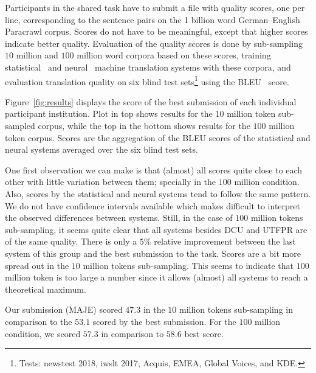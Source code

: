 Participants in the shared task have to submit a file with quality scores, one per line, corresponding to the sentence pairs on the 1 billion word German–English Paracrawl corpus. Scores do not have to be meaningful, except that higher scores indicate better quality. Evaluation of the quality scores is done by sub-sampling $10$ million and $100$ million word corpora based on these scores, training statistical~\cite{Moses} and neural~\cite{Marian} machine translation systems with these corpora, and evaluation translation quality on six blind test sets\footnote{Tests: newstest 2018, iwslt 2017, Acquis, EMEA, Global Voices, and KDE.} using the BLEU~\cite{Bleu} score. 

Figure~\ref{fig:results} displays the score of the best submission of each individual participant institution. Plot in top shows results for the $10$ million token sub-sampled corpus, while the top in the bottom shows results for the $100$ million token corpus. Scores are the aggregation of the BLEU scores of the statistical and neural systems averaged over the six blind test sets.

One first observation we can make is that (almost) all scores quite close to each other with little variation between them; specially in the $100$ million condition. Also, scores by the statistical and neural systems tend to follow the same pattern. We do not have confidence intervals available which makes difficult to interpret the observed differences between systems. Still, in the case of $100$ million tokens sub-sampling, it seems quite clear that all systems besides DCU and UTFPR are of the same quality. There is only a $5\%$ relative improvement between the last system of this group and the best submission to the task. Scores are a bit more spread out in the $10$ million tokens sub-sampling. This seems to indicate that $100$ million token is too large a number since it allows (almost) all systems to reach a theoretical maximum.

Our submission (MAJE) scored $47.3$ in the $10$ million tokens sub-sampling in comparison to the $53.1$ scored by the best submission. For the $100$ million condition, we scored $57.3$ in comparison to $58.6$ best score. 